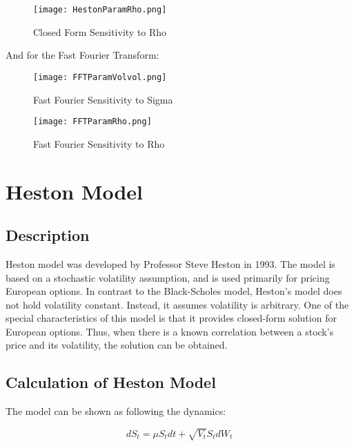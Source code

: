 \documentclass[fontsize=12pt]{article}
\numberwithin{equation}{section} %
\numberwithin{figure}{section} %
\numberwithin{table}{section} %
\begin{document}
\begin{figure}[H]
  \centering
   \texttt{[image: HestonParamRho.png]}
  \caption{Closed Form Sensitivity to Rho}
  \label{fig:CF sensitivity}
\end{figure}

	And for the Fast Fourier Transform:

\begin{figure}[H]
  \centering
   \texttt{[image: FFTParamVolvol.png]}
  \caption{Fast Fourier Sensitivity to Sigma}
  \label{fig:FFT sensitivity}
\end{figure}

\begin{figure}[H]
  \centering
   \texttt{[image: FFTParamRho.png]}
  \caption{Fast Fourier Sensitivity to Rho}
  \label{fig:FFT sensitivity}
\end{figure}



\section{Heston Model} \label{Heston Model}



\subsection{Description} \label{Description1}

Heston model was developed by Professor Steve Heston in 1993. The model is based on a stochastic volatility assumption, and is used primarily for pricing European options. In contrast to the Black-Scholes model, Heston's model does not hold volatility constant. Instead, it assumes volatility is arbitrary. One of the special characteristics of this model is that it provides closed-form solution for European options. Thus, when there is a known correlation between a stock's price and its volatility, the solution can be obtained.


\subsection{Calculation of Heston Model} \label{Calculation of Heston Model}
	The model can be shown as following the dynamics:

\begin{equation}
dS_t=\mu S_t dt+\sqrt{V_t} S_t dW_t	
\end{equation}
\end{document}
